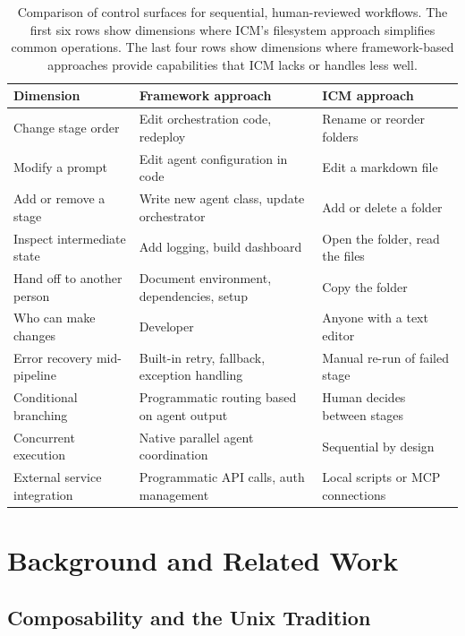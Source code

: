 \documentclass[acmlarge,nonacm,screen]{acmart}
\begin{document}
\begin{table}[t]
\centering
\caption{Comparison of control surfaces for sequential, human-reviewed workflows. The first six rows show dimensions where ICM's filesystem approach simplifies common operations. The last four rows show dimensions where framework-based approaches provide capabilities that ICM lacks or handles less well.}
\label{tab:comparison}
\begin{tabular}{p{3.2cm} p{4.5cm} p{4.5cm}}
\toprule
\textbf{Dimension} & \textbf{Framework approach} & \textbf{ICM approach} \\
\midrule
Change stage order & Edit orchestration code, redeploy & Rename or reorder folders \\
\addlinespace
Modify a prompt & Edit agent configuration in code & Edit a markdown file \\
\addlinespace
Add or remove a stage & Write new agent class, update orchestrator & Add or delete a folder \\
\addlinespace
Inspect intermediate state & Add logging, build dashboard & Open the folder, read the files \\
\addlinespace
Hand off to another person & Document environment, dependencies, setup & Copy the folder \\
\addlinespace
Who can make changes & Developer & Anyone with a text editor \\
\midrule
Error recovery mid-pipeline & Built-in retry, fallback, exception handling & Manual re-run of failed stage \\
\addlinespace
Conditional branching & Programmatic routing based on agent output & Human decides between stages \\
\addlinespace
Concurrent execution & Native parallel agent coordination & Sequential by design \\
\addlinespace
External service integration & Programmatic API calls, auth management & Local scripts or MCP connections \\
\bottomrule
\end{tabular}
\end{table}

\section{Background and Related Work}

\subsection{Composability and the Unix Tradition}
\end{document}
